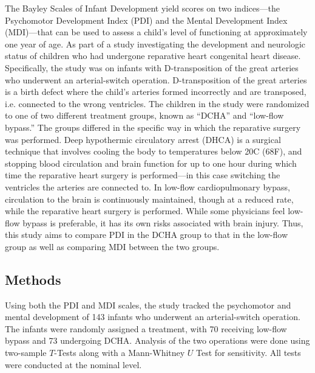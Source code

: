 \documentclass{article}
\begin{document}
\begin{enumerate}
		The Bayley Scales of Infant Development yield scores on two indices---the Psychomotor Development Index (PDI) and the Mental Development Index (MDI)---that can be used to assess a child's level of functioning at approximately one year of age. As part of a study investigating the development and neurologic status of children who had undergone reparative heart congenital heart disease. Specifically, the study was on infants with D-transposition of the great arteries who underwent an arterial-switch operation. D-transposition of the great arteries is a birth defect where the child's arteries formed incorrectly and are transposed, i.e. connected to the wrong ventricles. The children in the study were randomized to one of two different treatment groups, known as ``DCHA'' and ``low-flow bypass.'' The groups differed in the specific way in which the reparative surgery was performed. Deep hypothermic circulatory arrest (DHCA) is a surgical technique that involves cooling the body to temperatures below 20\degree C (68\degree F), and stopping blood circulation and brain function for up to one hour during which time the reparative heart surgery is performed---in this case switching the ventricles the arteries are connected to. In low-flow cardiopulmonary bypass, circulation to the brain is continuously maintained, though at a reduced rate, while the reparative heart surgery is performed. While some physicians feel low-flow bypass is preferable, it has its own risks associated with brain injury. Thus, this study aims to compare PDI in the DCHA group to that in the low-flow group as well as comparing MDI between the two groups.

		\subsection*{Methods}
		Using both the PDI and MDI scales, the study tracked the psychomotor and mental development of 143 infants who underwent an arterial-switch operation. The infants were randomly assigned a treatment, with 70 receiving low-flow bypass and 73 undergoing DCHA. Analysis of the two operations were done using two-sample $T$-Tests along with a Mann-Whitney $U$ Test for sensitivity. All tests were conducted at the nominal level.
		
	\end{enumerate}
		
\end{document}
